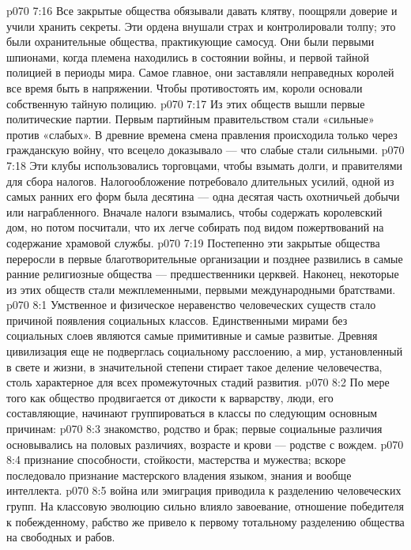 \vs p070 7:16 Все закрытые общества обязывали давать клятву, поощряли доверие и учили хранить секреты. Эти ордена внушали страх и контролировали толпу; это были охранительные общества, практикующие самосуд. Они были первыми шпионами, когда племена находились в состоянии войны, и первой тайной полицией в периоды мира. Самое главное, они заставляли неправедных королей все время быть в напряжении. Чтобы противостоять им, короли основали собственную тайную полицию.
\vs p070 7:17 Из этих обществ вышли первые политические партии. Первым партийным правительством стали «сильные» против «слабых». В древние времена смена правления происходила только через гражданскую войну, что всецело доказывало --- что слабые стали сильными.
\vs p070 7:18 Эти клубы использовались торговцами, чтобы взымать долги, и правителями для сбора налогов. Налогообложение потребовало длительных усилий, одной из самых ранних его форм была десятина --- одна десятая часть охотничьей добычи или награбленного. Вначале налоги взымались, чтобы содержать королевский дом, но потом посчитали, что их легче собирать под видом пожертвований на содержание храмовой службы.
\vs p070 7:19 Постепенно эти закрытые общества переросли в первые благотворительные организации и позднее развились в самые ранние религиозные общества --- предшественники церквей. Наконец, некоторые из этих обществ стали межплеменными, первыми международными братствами.
\vs p070 8:1 Умственное и физическое неравенство человеческих существ стало причиной появления социальных классов. Единственными мирами без социальных слоев являются самые примитивные и самые развитые. Древняя цивилизация еще не подверглась социальному расслоению, а мир, установленный в свете и жизни, в значительной степени стирает такое деление человечества, столь характерное для всех промежуточных стадий развития.
\vs p070 8:2 По мере того как общество продвигается от дикости к варварству, люди, его составляющие, начинают группироваться в классы по следующим основным причинам:
\vs p070 8:3 \bibnobreakspace {} знакомство, родство и брак; первые социальные различия основывались на половых различиях, возрасте и крови --- родстве с вождем.
\vs p070 8:4 \bibnobreakspace {} признание способности, стойкости, мастерства и мужества; вскоре последовало признание мастерского владения языком, знания и вообще интеллекта.
\vs p070 8:5 \bibnobreakspace {} война или эмиграция приводила к разделению человеческих групп. На классовую эволюцию сильно влияло завоевание, отношение победителя к побежденному, рабство же привело к первому тотальному разделению общества на свободных и рабов.

